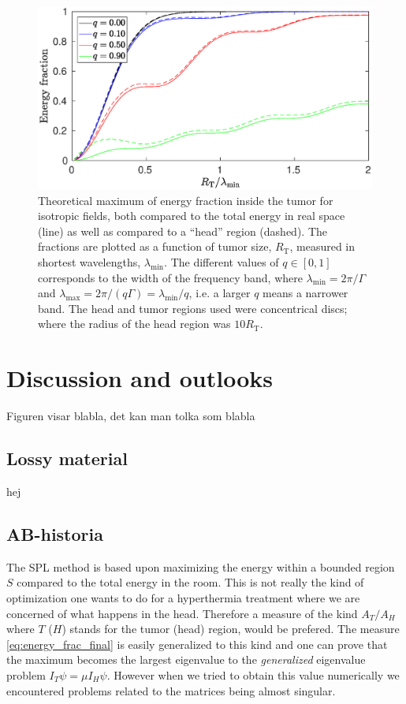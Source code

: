 \documentclass[11pt,a4paper, 
swedish,english %
]{article}
\newcommand{\RT}{\ensuremath{R_{\text{T}}}}
\begin{document}
\begin{figure}\centering
\centerline{ %
\includegraphics[width=18cm]{ring_both_L1000.eps}
}
\caption{Theoretical maximum of energy fraction inside the tumor for isotropic 
  fields, both compared to the total energy in real space (line) as well as
  compared to a ``head'' region (dashed). The fractions are plotted as
  a function of tumor size, $\RT$, measured in shortest wavelengths,
  $\lambda_{\min}$. The different values of $q\in[0, 1]$ corresponds to 
  the width of the frequency band, where $\lambda_{\min}=2\pi/\Gamma$ and
  $\lambda_{\max}=2\pi/(q\Gamma)=\lambda_{\min}/q$, i.e. a larger $q$
  means a narrower band. The head and tumor regions used were concentrical discs;
  where the radius of the head region was $10\RT$. }
\label{fig:both}
\end{figure}


\section{Discussion and outlooks}
Figuren visar blabla, det kan man tolka som blabla
\subsection{Lossy material}
hej
\subsection{AB-historia}
The SPL method is based upon maximizing the energy within a bounded region $S$
compared to the total energy in the room. This is not really the kind of optimization
one wants to do for a hyperthermia treatment where we are concerned of what happens in the head.
Therefore a measure of the kind $A_T/A_H$ where $T$ ($H$) stands for the tumor (head) region, would be prefered.
The measure \eqref{eq:energy_frac_final} is easily generalized to this kind and one can prove that the maximum
becomes the largest eigenvalue to the \emph{generalized} eigenvalue problem $I_T \psi=\mu I_H \psi$. However when we
tried to obtain this value numerically we encountered problems related to the matrices being almost singular.
\end{document}
